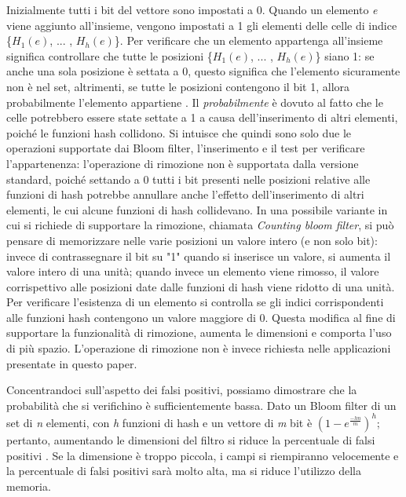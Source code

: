 \documentclass[../main.tex]{subfiles}
\begin{document}
\noindent
Inizialmente tutti i bit del vettore sono impostati a 0. Quando un elemento \textit{e} viene aggiunto all'insieme, vengono impostati a 1 gli elementi delle celle di indice \{$H_{1}(e)$, ... , $H_{h}(e)$\}. Per verificare che un elemento appartenga all'insieme significa controllare che tutte le posizioni \{$H_{1}(e)$, ... , $H_{h}(e)$\} siano 1: se anche una sola posizione è settata a 0, questo significa che l'elemento sicuramente non è nel set, altrimenti, se tutte le posizioni contengono il bit 1, allora probabilmente l'elemento appartiene \cite{compressedbloomfilter}. Il \textit{probabilmente} è dovuto al fatto che le celle potrebbero essere state settate a 1 a causa dell'inserimento di altri elementi, poiché le funzioni hash collidono. Si intuisce che quindi sono solo due le operazioni supportate dai Bloom filter, l'inserimento e il test per verificare l'appartenenza: l'operazione di rimozione non è supportata dalla versione standard, poiché settando a 0 tutti i bit presenti nelle posizioni relative alle funzioni di hash potrebbe annullare anche l'effetto dell'inserimento di altri elementi, le cui alcune funzioni di hash collidevano. In una possibile variante in cui si richiede di supportare la rimozione, chiamata \textit{Counting bloom filter}, si può pensare di memorizzare nelle varie posizioni un valore intero (e non solo bit): invece di contrassegnare il bit su "1" quando si inserisce un valore, si aumenta il valore intero di una unità; quando invece un elemento viene rimosso, il valore corrispettivo alle posizioni date dalle funzioni di hash viene ridotto di una unità. Per verificare l'esistenza di un elemento si controlla se gli indici corrispondenti alle funzioni hash contengono un valore maggiore di 0. Questa modifica al fine di supportare la funzionalità di rimozione, aumenta le dimensioni e comporta l'uso di più spazio. L'operazione di rimozione non è invece richiesta nelle applicazioni presentate in questo paper.

Concentrandoci sull'aspetto dei falsi positivi, possiamo dimostrare che la probabilità che si verifichino è sufficientemente bassa. Dato un Bloom filter di un set di \textit{n} elementi, con \textit{h} funzioni di hash e un vettore di \textit{m} bit è $(1 - e^{\frac{-hn}{m}})^{h} $; pertanto, aumentando le dimensioni del filtro si riduce la percentuale di falsi positivi \cite{bernardini2019malva} \cite{compressedbloomfilter}. Se la dimensione è troppo piccola, i campi si riempiranno velocemente e la percentuale di falsi positivi sarà molto alta, ma si riduce l'utilizzo della memoria. 
\end{document}
